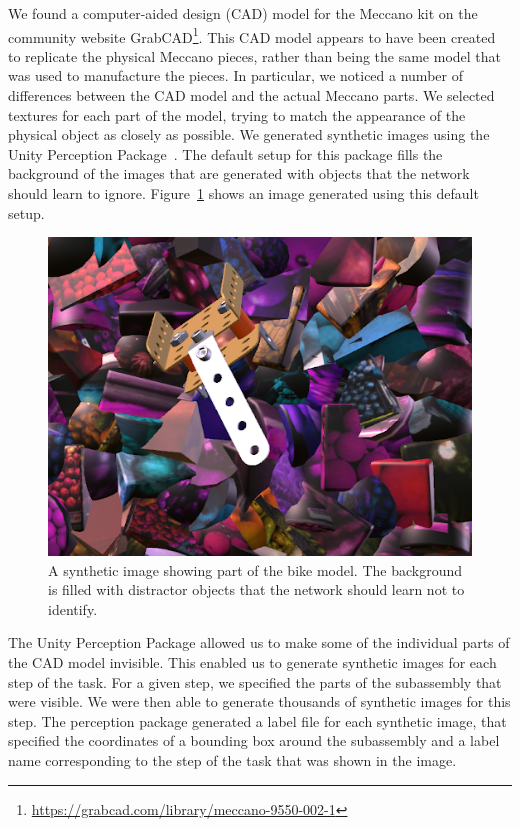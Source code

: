 We found a computer-aided design (CAD) model for the Meccano kit on the
community website
GrabCAD\footnote{\url{https://grabcad.com/library/meccano-9550-002-1}}.
This CAD model appears to have been created to replicate the physical Meccano
pieces, rather than being the same model that was used to manufacture the
pieces.
In particular, we noticed a number of differences between the CAD model and the
actual Meccano parts.
We selected textures for each part of the model, trying to match the
appearance of the physical object as closely as possible.
We generated synthetic images using the Unity Perception Package~\cite{unity}.
The default setup for this package fills the background of the images that are
generated with objects that the network should learn to ignore.
Figure~\ref{fig:perception_default} shows an image generated using this default
setup.

\begin{figure}
  \includegraphics[width=\columnwidth]{figures/synthetic/perception_default.png}
  \caption{
    A synthetic image showing part of the bike model. The background is filled
    with distractor objects that the network should learn not to identify.
  }\label{fig:perception_default}
\end{figure}

The Unity Perception Package allowed us to make some of the individual parts of
the CAD model invisible.
This enabled us to generate synthetic images for each step of the task.
For a given step, we specified the parts of the subassembly that were visible.
We were then able to generate thousands of synthetic images for this step.
The perception package generated a label file for each synthetic image, that
specified the coordinates of a bounding box around the subassembly and a label
name corresponding to the step of the task that was shown in the image.

